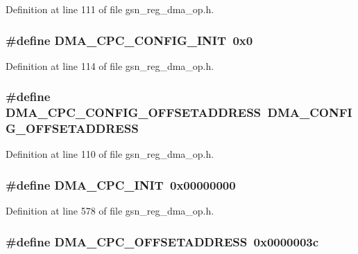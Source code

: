 Definition at line 111 of file gsn\_\-reg\_\-dma\_\-op.h.

\hypertarget{a00547_afa9e72d773ecb33158a9a13a2408647a}{
\subsubsection[{DMA\_\-CPC\_\-CONFIG\_\-INIT}]{\setlength{\rightskip}{0pt plus 5cm}\#define DMA\_\-CPC\_\-CONFIG\_\-INIT~0x0}}
\label{a00547_afa9e72d773ecb33158a9a13a2408647a}


Definition at line 114 of file gsn\_\-reg\_\-dma\_\-op.h.

\hypertarget{a00547_aaa4e3b81c7de5fa6b230b23d3671ec8d}{
\subsubsection[{DMA\_\-CPC\_\-CONFIG\_\-OFFSETADDRESS}]{\setlength{\rightskip}{0pt plus 5cm}\#define DMA\_\-CPC\_\-CONFIG\_\-OFFSETADDRESS~DMA\_\-CONFIG\_\-OFFSETADDRESS}}
\label{a00547_aaa4e3b81c7de5fa6b230b23d3671ec8d}


Definition at line 110 of file gsn\_\-reg\_\-dma\_\-op.h.

\hypertarget{a00547_a928380a4adf5ce1ac5b2045a9cfdaa3b}{
\subsubsection[{DMA\_\-CPC\_\-INIT}]{\setlength{\rightskip}{0pt plus 5cm}\#define DMA\_\-CPC\_\-INIT~0x00000000}}
\label{a00547_a928380a4adf5ce1ac5b2045a9cfdaa3b}


Definition at line 578 of file gsn\_\-reg\_\-dma\_\-op.h.

\hypertarget{a00547_aee4ad4fa572e344f5f60f98ef3a04f2e}{
\subsubsection[{DMA\_\-CPC\_\-OFFSETADDRESS}]{\setlength{\rightskip}{0pt plus 5cm}\#define DMA\_\-CPC\_\-OFFSETADDRESS~0x0000003c}}
\label{a00547_aee4ad4fa572e344f5f60f98ef3a04f2e}


